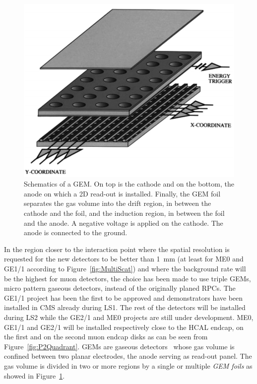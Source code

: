 \begingroup\setlength{\intextsep}{0pt}\setlength{\columnsep}{15pt}

	\begin{figure}
		\centering
		\includegraphics[width=0.9\linewidth]{fig/chapt4/GEM.png}
		\caption{\label{fig:GEM} Schematics of a GEM. On top is the cathode and on the bottom, the anode on which a 2D read-out is installed. Finally, the GEM foil separates the gas volume into the drift region, in between the cathode and the foil, and the induction region, in between the foil and the anode. A negative voltage is applied on the cathode. The anode is connected to the ground.}
	\end{figure}
	
	In the region closer to the interaction point where the spatial resolution is requested for the new detectors to be better than \SI{1}{mm} (at least for ME0 and GE1/1 according to Figure~\ref{fig:MultiScat}) and where the background rate will be the highest for muon detectors, the choice has been made to use triple GEMs, micro pattern gaseous detectors, instead of the originally planed RPCs. The GE1/1 project has been the first to be approved and demonstrators have been installed in CMS already during LS1. The rest of the detectors will be installed during LS2 while the GE2/1 and ME0 projects are still under development. ME0, GE1/1 and GE2/1 will be installed respectively close to the HCAL endcap, on the first and on the second muon endcap disks as can be seen from Figure~\ref{fig:P2Quadrant}. \acl{GEM}s are gaseous detectors~\cite{SAULI97} whose gas volume is confined between two planar electrodes, the anode serving as read-out panel. The gas volume is divided in two or more regions by a single or multiple \textit{GEM foils} as showed in Figure~\ref{fig:GEM}.
	
